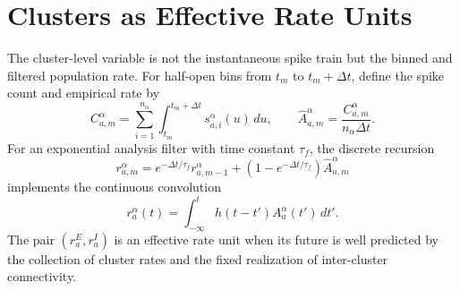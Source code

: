 \section{Clusters as Effective Rate Units}
\label{sec:ch08-effective-rate-units}

The cluster-level variable is not the instantaneous spike train but the binned
and filtered population rate. For half-open bins from \(t_m\) to
\(t_m+\Delta t\), define the spike count and empirical rate by
\begin{equation}
    C_{a,m}^\alpha
    =
    \sum_{i=1}^{n_\alpha}
    \int_{t_m}^{t_m+\Delta t}s_{a,i}^{\alpha}(u)\,du,
    \qquad
    \widehat A_{a,m}^{\alpha}
    =
    \frac{C_{a,m}^{\alpha}}{n_\alpha\Delta t}.
    \label{eq:ch08-binned-cluster-rate}
\end{equation}
For an exponential analysis filter with time constant \(\tau_f\), the discrete
recursion
\begin{equation}
    r_{a,m}^{\alpha}
    =
    e^{-\Delta t/\tau_f}r_{a,m-1}^{\alpha}
    +
    \left(1-e^{-\Delta t/\tau_f}\right)\widehat A_{a,m}^{\alpha}
    \label{eq:ch08-filtered-rate-recursion}
\end{equation}
implements the continuous convolution
\begin{equation}
    r_a^\alpha(t)
    =
    \int_{-\infty}^{t}
    h(t-t') A_a^\alpha(t')\,dt'.
    \label{eq:ch08-filtered-rate}
\end{equation}
The pair \((r_a^E,r_a^I)\) is an effective rate unit when its future is well
predicted by the collection of cluster rates and the fixed realization of
inter-cluster connectivity.

